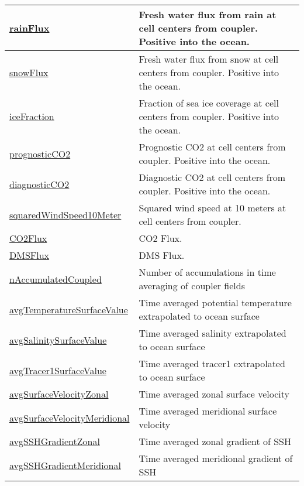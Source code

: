 {\begin{center}
\begin{longtable}{| p{2.0in} | p{4.0in} |}
	\hline
	\hyperref[subsec:var_sec_forcing_rainFlux]{rainFlux} & Fresh water flux from rain at cell centers from coupler. Positive into the ocean. \\
	\hline
	\hyperref[subsec:var_sec_forcing_snowFlux]{snowFlux} & Fresh water flux from snow at cell centers from coupler. Positive into the ocean. \\
	\hline
	\hyperref[subsec:var_sec_forcing_iceFraction]{iceFraction} & Fraction of sea ice coverage at cell centers from coupler. Positive into the ocean. \\
	\hline
	\hyperref[subsec:var_sec_forcing_prognosticCO2]{prognosticCO2} & Prognostic CO2 at cell centers from coupler. Positive into the ocean. \\
	\hline
	\hyperref[subsec:var_sec_forcing_diagnosticCO2]{diagnosticCO2} & Diagnostic CO2 at cell centers from coupler. Positive into the ocean. \\
	\hline
	\hyperref[subsec:var_sec_forcing_squaredWindSpeed10Meter]{squaredWindSpeed10Meter} & Squared wind speed at 10 meters at cell centers from coupler. \\
	\hline
	\hyperref[subsec:var_sec_forcing_CO2Flux]{CO2Flux} & CO2 Flux. \\
	\hline
	\hyperref[subsec:var_sec_forcing_DMSFlux]{DMSFlux} & DMS Flux. \\
	\hline
	\hyperref[subsec:var_sec_forcing_nAccumulatedCoupled]{nAccumulatedCoupled} & Number of accumulations in time averaging of coupler fields \\
	\hline
	\hyperref[subsec:var_sec_forcing_avgTemperatureSurfaceValue]{avgTemperatureSurfaceValue} & Time averaged potential temperature extrapolated to ocean surface \\
	\hline
	\hyperref[subsec:var_sec_forcing_avgSalinitySurfaceValue]{avgSalinitySurfaceValue} & Time averaged salinity extrapolated to ocean surface \\
	\hline
	\hyperref[subsec:var_sec_forcing_avgTracer1SurfaceValue]{avgTracer1SurfaceValue} & Time averaged tracer1 extrapolated to ocean surface \\
	\hline
	\hyperref[subsec:var_sec_forcing_avgSurfaceVelocityZonal]{avgSurfaceVelocityZonal} & Time averaged zonal surface velocity \\
	\hline
	\hyperref[subsec:var_sec_forcing_avgSurfaceVelocityMeridional]{avgSurfaceVelocityMeridional} & Time averaged meridional surface velocity \\
	\hline
	\hyperref[subsec:var_sec_forcing_avgSSHGradientZonal]{avgSSHGradientZonal} & Time averaged zonal gradient of SSH \\
	\hline
	\hyperref[subsec:var_sec_forcing_avgSSHGradientMeridional]{avgSSHGradientMeridional} & Time averaged meridional gradient of SSH \\
	\hline
\end{longtable}
\end{center}
}
